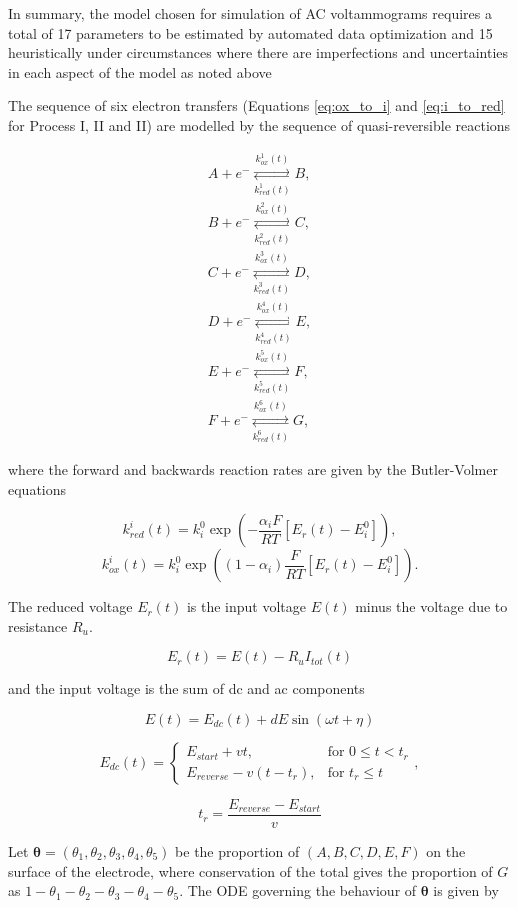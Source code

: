 \documentclass[a4paper, 12pt]{article}
\begin{document}
In summary, the model chosen for simulation of AC voltammograms requires a total 
of 17 parameters to be estimated by automated data optimization and 15 
heuristically under circumstances where there are imperfections and 
uncertainties in each aspect of the model as noted above 

The sequence of six electron transfers (Equations \ref{eq:ox_to_i} and 
\ref{eq:i_to_red} for Process I, II and II) are modelled by the sequence of 
quasi-reversible reactions

\begin{align} \label{eq:reaction}
    A + e^- \underset{k^1_{red}(t)}{\overset{k^1_{ox}(t)}{\rightleftarrows}} B, 
    \\
    B + e^- \underset{k^2_{red}(t)}{\overset{k^2_{ox}(t)}{\rightleftarrows}} C, 
    \\
    C + e^- \underset{k^3_{red}(t)}{\overset{k^3_{ox}(t)}{\rightleftarrows}} D, 
    \\
    D + e^- \underset{k^4_{red}(t)}{\overset{k^4_{ox}(t)}{\rightleftarrows}} E, 
    \\
    E + e^- \underset{k^5_{red}(t)}{\overset{k^5_{ox}(t)}{\rightleftarrows}} F, 
    \\
    F + e^-  \underset{k^6_{red}(t)}{\overset{k^6_{ox}(t)}{\rightleftarrows}} G,
\end{align}

where the forward and backwards reaction rates are given by the Butler-Volmer 
equations

$$
k^i_{red}(t) = k^0_i \exp\left(-\frac{\alpha_i F}{RT} [E_r(t) - E^0_i] \right),
$$
$$
k^i_{ox}(t) = k^0_i \exp\left((1-\alpha_i)\frac{F}{RT} [E_r(t) - E^0_i] \right).
$$

The reduced voltage $E_r(t)$ is the input voltage $E(t)$ minus the voltage due 
to resistance $R_u$.

$$
E_r(t) = E(t) - R_u I_{tot}(t)
$$

and the input voltage is the sum of dc and ac components

$$
E(t) = E_{dc}(t) + dE\sin(\omega t + \eta)
$$

$$
E_{dc}(t) = \left. \begin{cases} E_{start} + vt, & \text{for } 0 \le t < t_r\\
E_{reverse} - v(t-t_r), & \text{for } t_r \le t
\end{cases} \right. ,
$$

$$
t_r = \frac{E_{reverse}-E_{start}}{v}
$$

Let $\mathbf{\theta} = (\theta_1,\theta_2,\theta_3,\theta_4,\theta_5)$ be the 
proportion of $(A,B,C,D,E,F)$ on the surface of the electrode, where 
conservation of the total gives the proportion of $G$ as 
$1-\theta_1-\theta_2-\theta_3-\theta_4-\theta_5$. The ODE governing the 
behaviour of $\mathbf{\theta}$ is given by
\end{document}
